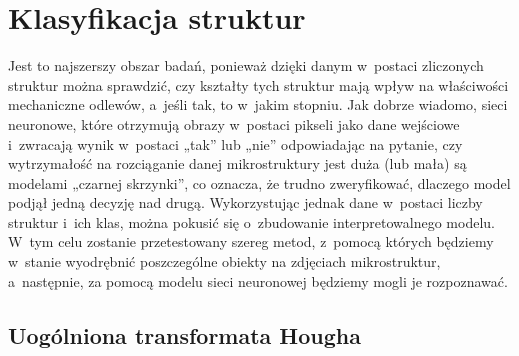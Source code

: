 \section{Klasyfikacja struktur}
\label{sec:klasyfikacja_struktur}

Jest to najszerszy obszar badań, ponieważ dzięki danym w~postaci zliczonych struktur można sprawdzić, czy kształty tych struktur mają wpływ na właściwości mechaniczne odlewów, a~jeśli tak, to w~jakim stopniu. Jak dobrze wiadomo, sieci neuronowe, które otrzymują obrazy w~postaci pikseli jako dane wejściowe i~zwracają wynik w~postaci „tak” lub „nie” odpowiadając na pytanie, czy wytrzymałość na rozciąganie danej mikrostruktury jest duża (lub mała) są modelami „czarnej skrzynki”, co oznacza, że trudno zweryfikować, dlaczego model podjął jedną decyzję nad drugą. Wykorzystując jednak dane w~postaci liczby struktur i~ich klas, można pokusić się o~zbudowanie interpretowalnego modelu. W~tym celu zostanie przetestowany szereg metod, z~pomocą których będziemy w~stanie wyodrębnić poszczególne obiekty na zdjęciach mikrostruktur, a~następnie, za pomocą modelu sieci neuronowej będziemy mogli je rozpoznawać. 

\subsection{Uogólniona transformata Hougha}
\label{hough}


